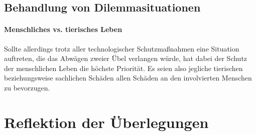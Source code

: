\documentclass[twocolumn, german]{tum-article}
\begin{document}
\subsection{Behandlung von Dilemmasituationen}
\paragraph{Menschliches vs. tierisches Leben}
Sollte allerdings trotz aller technologischer Schutzmaßnahmen eine Situation auftreten, die das Abwägen zweier Übel verlangen würde, hat dabei der Schutz der menschlichen Leben die höchste Priorität.
Es seien also jegliche tierischen beziehungsweise sachlichen Schäden allen Schäden an den involvierten Menschen zu bevorzugen. %

\section{Reflektion der Überlegungen}
\label{sec:reflect}

\printbibliography
\end{document}
